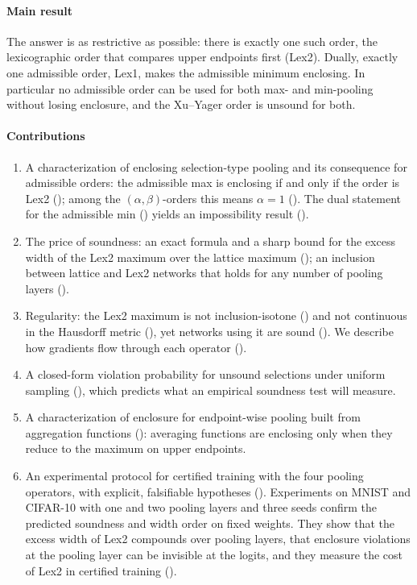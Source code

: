 \documentclass[preprint,12pt]{elsarticle}
\theoremstyle{definition}
\begin{document}
\paragraph{Main result} The answer is as restrictive as possible: there is exactly one such order, the lexicographic order that compares upper endpoints first (Lex2). Dually, exactly one admissible order, Lex1, makes the admissible minimum enclosing. In particular no admissible order can be used for both max- and min-pooling without losing enclosure, and the Xu--Yager order \cite{xu2006} is unsound for both.

\paragraph{Contributions}
\begin{enumerate}[leftmargin=*]
\item A characterization of enclosing selection-type pooling and its consequence for admissible orders: the admissible max is enclosing if and only if the order is Lex2 (); among the $(\alpha,\beta)$-orders this means $\alpha=1$ (). The dual statement for the admissible min () yields an impossibility result ().
\item The price of soundness: an exact formula and a sharp bound for the excess width of the Lex2 maximum over the lattice maximum (); an inclusion between lattice and Lex2 networks that holds for any number of pooling layers ().
\item Regularity: the Lex2 maximum is not inclusion-isotone () and not continuous in the Hausdorff metric (), yet networks using it are sound (). We describe how gradients flow through each operator ().
\item A closed-form violation probability for unsound selections under uniform sampling (), which predicts what an empirical soundness test will measure.
\item A characterization of enclosure for endpoint-wise pooling built from aggregation functions (): averaging functions are enclosing only when they reduce to the maximum on upper endpoints.
\item An experimental protocol for certified training with the four pooling operators, with explicit, falsifiable hypotheses (). Experiments on MNIST and CIFAR-10 with one and two pooling layers and three seeds confirm the predicted soundness and width order on fixed weights. They show that the excess width of Lex2 compounds over pooling layers, that enclosure violations at the pooling layer can be invisible at the logits, and they measure the cost of Lex2 in certified training ().
\end{enumerate}
\end{document}
